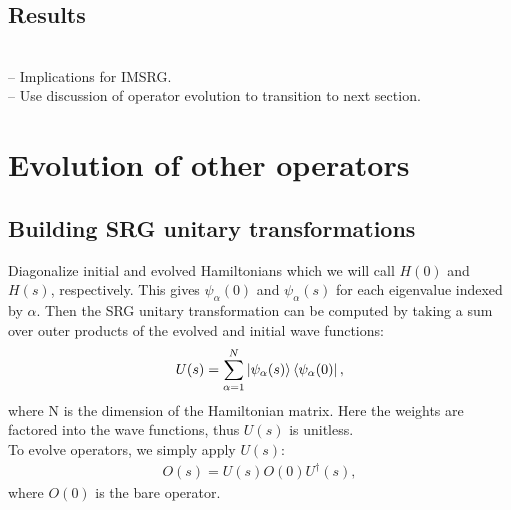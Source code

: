 \documentclass[preprintnumbers,floatfix,aps,prc,preprint,nofootinbib]{revtex4-1}
\begin{document}
\subsection{Results}
\label{sec:magnus_expansion_results}


\\
-- Implications for IMSRG.
\\
-- Use discussion of operator evolution to transition to next section.


\section{Evolution of other operators}
\label{sec:evolution_other_operators}




\subsection{Building SRG unitary transformations}
\label{sec:srg_unitary_transformations}


Diagonalize initial and evolved Hamiltonians which we will call $H(0)$ and $H(s)$, respectively. This gives $\psi_{\alpha}(0)$ and $\psi_{\alpha}(s)$ for each eigenvalue indexed by $\alpha$. Then the SRG unitary transformation can be computed by taking a sum over outer products of the evolved and initial wave functions:
%
\begin{eqnarray}
	\label{eq:unitary_transformation}
	U(s) = \sum_{\alpha=1}^{N} \ket{\psi_{\alpha}(s)} \bra{\psi_{\alpha}(0)},
\end{eqnarray}
%
where N is the dimension of the Hamiltonian matrix. Here the weights are factored into the wave functions, thus $U(s)$ is unitless.
\\

To evolve operators, we simply apply $U(s)$:
%
\begin{eqnarray}
	\label{eq:evolved_operator}
	O(s) = U(s) O(0) U^{\dagger}(s),
\end{eqnarray}
%
where $O(0)$ is the bare operator.


\end{document}
